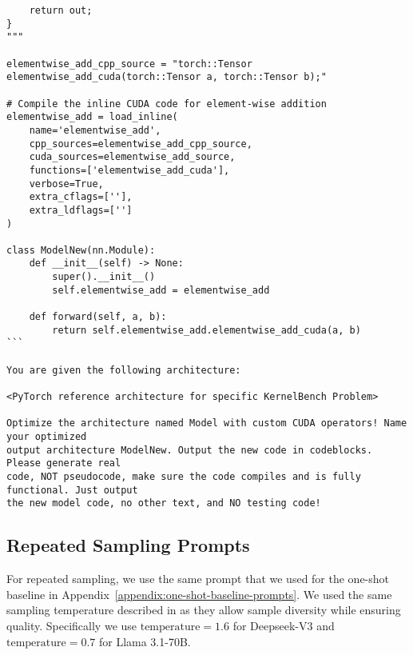 \begin{lstlisting}
    return out;
}
"""

elementwise_add_cpp_source = "torch::Tensor elementwise_add_cuda(torch::Tensor a, torch::Tensor b);"

# Compile the inline CUDA code for element-wise addition
elementwise_add = load_inline(
    name='elementwise_add',
    cpp_sources=elementwise_add_cpp_source,
    cuda_sources=elementwise_add_source,
    functions=['elementwise_add_cuda'],
    verbose=True,
    extra_cflags=[''],
    extra_ldflags=['']
)

class ModelNew(nn.Module):
    def __init__(self) -> None:
        super().__init__()
        self.elementwise_add = elementwise_add

    def forward(self, a, b):
        return self.elementwise_add.elementwise_add_cuda(a, b)
```

You are given the following architecture: 

<PyTorch reference architecture for specific KernelBench Problem>

Optimize the architecture named Model with custom CUDA operators! Name your optimized
output architecture ModelNew. Output the new code in codeblocks. Please generate real
code, NOT pseudocode, make sure the code compiles and is fully functional. Just output
the new model code, no other text, and NO testing code! 
\end{lstlisting}


\subsection{Repeated Sampling Prompts}\label{appendix:multi-sampling-baseline-prompts}
For repeated sampling, we use the same prompt that we used for the one-shot baseline in Appendix~\ref{appendix:one-shot-baseline-prompts}. We used the same sampling temperature described in \cite{brown2024largelanguagemonkeysscaling} as they allow sample diversity while ensuring quality. Specifically we use $\text{temperature}=1.6$ for Deepseek-V3 and  $\text{temperature}=0.7$ for Llama 3.1-70B.

